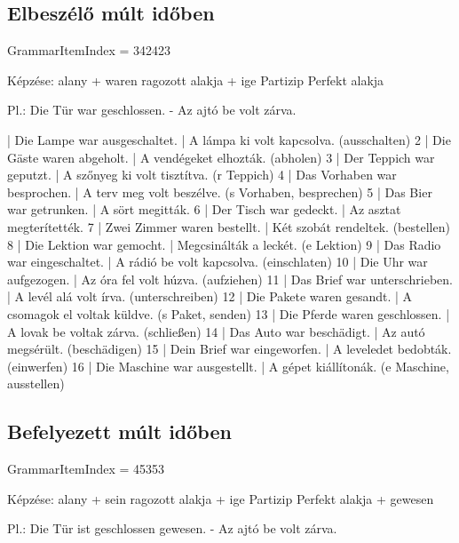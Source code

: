 \documentclass{article}
\newenvironment{desc}{\verbatim}{\endverbatim}
\newenvironment{exmp}{\verbatim}{\endverbatim}
\begin{document}
\subsection{Elbeszélő múlt időben}

GrammarItemIndex = 342423

\begin{desc}
Képzése:
alany + waren ragozott alakja + ige Partizip Perfekt alakja

Pl.: Die Tür war geschlossen. - Az ajtó be volt zárva.
\end{desc}

\begin{exmp}
1 | Die Lampe war ausgeschaltet. | A lámpa ki volt kapcsolva. (ausschalten)
2 | Die Gäste waren abgeholt. | A vendégeket elhozták. (abholen)
3 | Der Teppich war geputzt. | A szőnyeg ki volt tisztítva. (r Teppich)
4 | Das Vorhaben war besprochen. | A terv meg volt beszélve. (s Vorhaben, besprechen)
5 | Das Bier war getrunken. | A sört megitták.
6 | Der Tisch war gedeckt. | Az asztat megterítették.
7 | Zwei Zimmer waren bestellt. | Két szobát rendeltek. (bestellen)
8 | Die Lektion war gemocht. | Megcsinálták a leckét. (e Lektion)
9 | Das Radio war eingeschaltet. | A rádió be volt kapcsolva. (einschlaten)
10 | Die Uhr war aufgezogen. | Az óra fel volt húzva. (aufziehen)
11 | Das Brief war unterschrieben. | A levél alá volt írva. (unterschreiben)
12 | Die Pakete waren gesandt. | A csomagok el voltak küldve. (s Paket, senden)
13 | Die Pferde waren geschlossen. | A lovak be voltak zárva. (schließen)
14 | Das Auto war beschädigt. | Az autó megsérült. (beschädigen)
15 | Dein Brief war eingeworfen. | A leveledet bedobták. (einwerfen)
16 | Die Maschine war ausgestellt. | A gépet kiállítonák. (e Maschine, ausstellen)
\end{exmp}

\subsection{Befelyezett múlt időben}

GrammarItemIndex = 45353

\begin{desc}
Képzése:
alany + sein ragozott alakja + ige Partizip Perfekt alakja + gewesen

Pl.: Die Tür ist geschlossen gewesen. - Az ajtó be volt zárva.
\end{desc}
\end{document}
